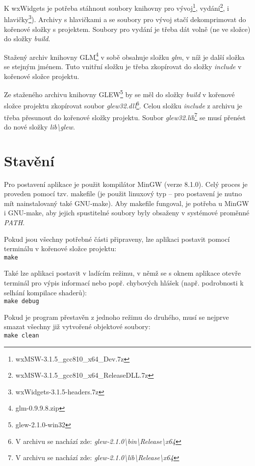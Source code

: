 \documentclass[a4paper, 11pt]{report}
\begin{document}
K wxWidgets je potřeba stáhnout soubory knihovny pro vývoj\footnote{wxMSW-3.1.5\_gcc810\_x64\_Dev.7z}, vydání\footnote{wxMSW-3.1.5\_gcc810\_x64\_ReleaseDLL.7z}, i hlavičky\footnote{wxWidgets-3.1.5-headers.7z}). Archivy s hlavičkami a se soubory pro vývoj stačí dekomprimovat do kořenové složky s projektem. Soubory pro vydání je třeba dát volně (ne ve složce) do složky \emph{build}.

Stažený archiv knihovny GLM\footnote{glm-0.9.9.8.zip} v sobě obsahuje složku \emph{glm}, v níž je další složka se stejným jménem. Tuto vnitřní složku je třeba zkopírovat do složky \emph{include} v kořenové složce projektu.

Ze staženého archivu knihovny GLEW\footnote{glew-2.1.0-win32} by se měl do složky \emph{build} v kořenové složce projektu zkopírovat soubor \emph{glew32.dll}\footnote{V archivu se nachází zde: \emph{glew-2.1.0\textbackslash bin\textbackslash Release\textbackslash x64}}. Celou složku \emph{include} z archivu je třeba přesunout do kořenové složky projektu. Soubor \emph{glew32.lib}\footnote{V archivu se nachází zde: \emph{glew-2.1.0\textbackslash lib\textbackslash Release\textbackslash x64}} se musí přenést do nové složky \emph{lib\textbackslash glew}.

\section{Stavění}
Pro postavení aplikace je použit kompilátor MinGW (verze 8.1.0). Celý proces je proveden pomocí tzv. makefile (je použit linuxový typ -- pro postavení je nutno mít nainstalovaný také GNU-make). Aby makefile fungoval, je potřeba u MinGW i GNU-make, aby jejich spustitelné soubory byly obsaženy v systémové proměnné \emph{PATH}.

Pokud jsou všechny potřebné části připraveny, lze aplikaci postavit pomocí terminálu v kořenové složce projektu:\\
\texttt{make}

Také lze aplikaci postavit v ladícím režimu, v němž se s oknem aplikace otevře terminál pro výpis informací nebo popř. chybových hlášek (např. podrobnosti k selhání kompilace shaderů):\\
\texttt{make debug}

\begin{minipage}{\textwidth}
Pokud je program přestavěn z jednoho režimu do druhého, musí se nejprve smazat všechny již vytvořené objektové soubory:\\
\texttt{make clean}
\end{minipage}
\end{document}
